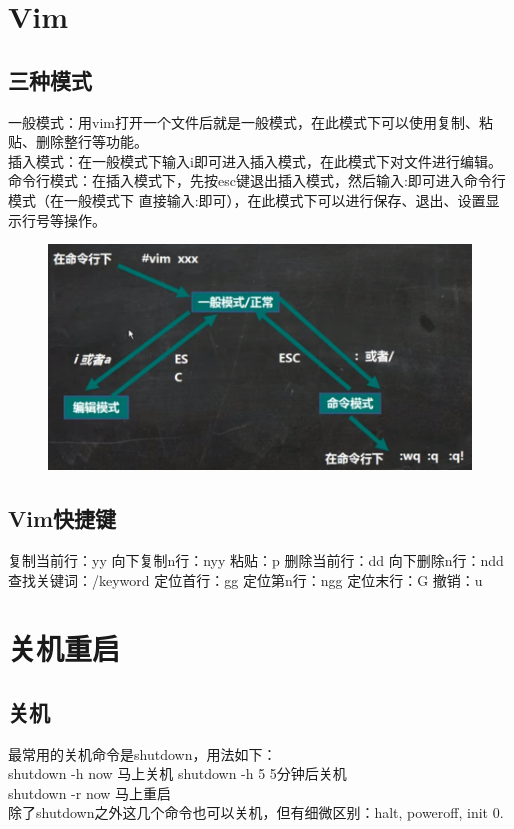 \documentclass[11pt]{article}
\begin{document}
\section{Vim}

\subsection{三种模式}
 一般模式：用vim打开一个文件后就是一般模式，在此模式下可以使用复制、粘贴、删除整行等功能。  \\
 插入模式：在一般模式下输入i即可进入插入模式，在此模式下对文件进行编辑。  \\
 命令行模式：在插入模式下，先按esc键退出插入模式，然后输入:即可进入命令行模式（在一般模式下
直接输入:即可），在此模式下可以进行保存、退出、设置显示行号等操作。
\begin{figure}[htb]
    \centering
    \includegraphics[scale=0.18]{imgs/vim_mode.png}
\end{figure}

\subsection{Vim快捷键}
复制当前行：yy \qquad 向下复制n行：nyy \qquad 粘贴：p \qquad 删除当前行：dd \qquad 
向下删除n行：ndd \qquad 查找关键词：/keyword \qquad 定位首行：gg \qquad 定位第n行：ngg
\qquad 定位末行：G \qquad 撤销：u

\section{关机重启}

\subsection{关机}
最常用的关机命令是shutdown，用法如下： \\
shutdown -h now \qquad 马上关机 \qquad shutdown -h 5 \qquad 5分钟后关机 \\
shutdown -r now \qquad 马上重启 \\
除了shutdown之外这几个命令也可以关机，但有细微区别：halt, poweroff, init 0.
\end{document}
